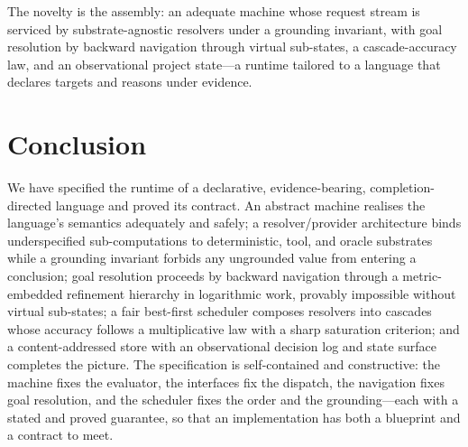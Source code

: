 \documentclass[11pt,a4paper]{article}
\theoremstyle{plain}
\theoremstyle{definition}
\theoremstyle{remark}
\begin{document}
The novelty is the assembly: an adequate machine whose request stream is
serviced by substrate-agnostic resolvers under a grounding invariant, with goal
resolution by backward navigation through virtual sub-states, a cascade-accuracy
law, and an observational project state---a runtime tailored to a language that
declares targets and reasons under evidence.

\section{Conclusion}
\label{sec:conclusion}

We have specified the runtime of a declarative, evidence-bearing,
completion-directed language and proved its contract. An abstract machine
realises the language's semantics adequately and safely; a resolver/provider
architecture binds underspecified sub-computations to deterministic, tool, and
oracle substrates while a grounding invariant forbids any ungrounded value from
entering a conclusion; goal resolution proceeds by backward navigation through a
metric-embedded refinement hierarchy in logarithmic work, provably impossible
without virtual sub-states; a fair best-first scheduler composes resolvers into
cascades whose accuracy follows a multiplicative law with a sharp saturation
criterion; and a content-addressed store with an observational decision log and
state surface completes the picture. The specification is self-contained and
constructive: the machine fixes the evaluator, the interfaces fix the dispatch,
the navigation fixes goal resolution, and the scheduler fixes the order and the
grounding---each with a stated and proved guarantee, so that an implementation
has both a blueprint and a contract to meet.



\end{document}
